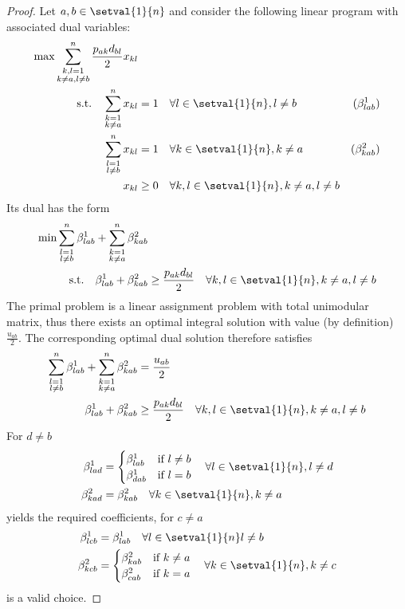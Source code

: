 \begin{proof}
	Let $a,b\in\setval{1}{n}$ and consider the following linear program with associated dual variables:
	\begin{align*}
		\max \sum_{\substack{k,l=1\\k\neq a, l\neq b}}^n \frac{p_{ak}d_{bl}}{2}x_{kl}&\\
		\text{s.t.}\quad\sum_{\substack{k=1\\k\neq a}}^nx_{kl}&=1\quad\forall l\in\setval{1}{n}, l\neq b &(\beta^1_{lab})\\
		\sum_{\substack{l=1\\l\neq b}}^nx_{kl}&=1\quad\forall k\in\setval{1}{n}, k\neq a &(\beta^2_{kab})\\
		x_{kl}&\geq 0\quad\forall k,l\in\setval{1}{n}, k\neq a, l\neq b
	\end{align*}
	Its dual has the form
	\begin{align*}
		\min \sum_{\substack{l=1\\l\neq b}}^n\beta^1_{lab} + \sum_{\substack{k=1\\k\neq a}}^n\beta^2_{kab} &\\
		\text{s.t.}\quad\beta^1_{lab} + \beta^2_{kab}&\geq \frac{p_{ak}d_{bl}}{2}\quad\forall k,l\in\setval{1}{n}, k\neq a, l\neq b
	\end{align*}
	The primal problem is a linear assignment problem with total unimodular matrix, thus there exists an optimal integral solution with value (by definition)~$\frac{u_{ab}}{2}$. The corresponding optimal dual solution therefore satisfies
	\begin{align*}
		\sum_{\substack{l=1\\l\neq b}}^n\beta^1_{lab} + \sum_{\substack{k=1\\k\neq a}}^n\beta^2_{kab} & = \frac{u_{ab}}{2}\\
		\quad\beta^1_{lab} + \beta^2_{kab}&\geq \frac{p_{ak}d_{bl}}{2}\quad\forall k,l\in\setval{1}{n}, k\neq a, l\neq b
	\end{align*}
	For $d\neq b$ 
	\begin{align*}
		\beta^1_{lad} &= 
		\begin{cases}
			\beta^1_{lab}&\text{if }l\neq b\\
			\beta^1_{dab}&\text{if }l = b
		\end{cases}\quad\forall l\in\setval{1}{n},l\neq d\\
		\beta^2_{kad} &= \beta^2_{kab}\quad\forall k\in\setval{1}{n},k\neq a
	\end{align*}
	yields the required coefficients, for $c\neq a$
	\begin{align*}
		\beta^1_{lcb} &=\beta^1_{lab}\quad\forall l\in\setval{1}{n}l\neq b\\
		\beta^2_{kcb} &=
		\begin{cases}
			\beta^2_{kab}&\text{if }k\neq a\\
			\beta^2_{cab}&\text{if }k = a
		\end{cases}\quad\forall k\in\setval{1}{n},k\neq c
	\end{align*}
	is a valid choice.
\end{proof}

